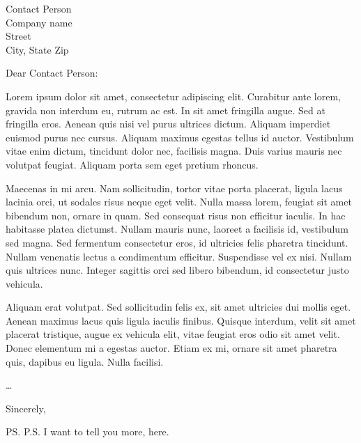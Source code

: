 \documentclass[10pt]{letter}
\begin{document}
\begin{letter}{Contact Person\\ Company name\\ Street\\ City, State Zip}

\opening{Dear Contact Person:}

Lorem ipsum dolor sit amet, consectetur adipiscing elit. Curabitur ante lorem, gravida non interdum eu, rutrum ac est. In sit amet fringilla augue. Sed at fringilla eros. Aenean quis nisi vel purus ultrices dictum. Aliquam imperdiet euismod purus nec cursus. Aliquam maximus egestas tellus id auctor. Vestibulum vitae enim dictum, tincidunt dolor nec, facilisis magna. Duis varius mauris nec volutpat feugiat. Aliquam porta sem eget pretium rhoncus.

Maecenas in mi arcu. Nam sollicitudin, tortor vitae porta placerat, ligula lacus lacinia orci, ut sodales risus neque eget velit. Nulla massa lorem, feugiat sit amet bibendum non, ornare in quam. Sed consequat risus non efficitur iaculis. In hac habitasse platea dictumst. Nullam mauris nunc, laoreet a facilisis id, vestibulum sed magna. Sed fermentum consectetur eros, id ultricies felis pharetra tincidunt. Nullam venenatis lectus a condimentum efficitur. Suspendisse vel ex nisi. Nullam quis ultrices nunc. Integer sagittis orci sed libero bibendum, id consectetur justo vehicula.

Aliquam erat volutpat. Sed sollicitudin felis ex, sit amet ultricies dui mollis eget. Aenean maximus lacus quis ligula iaculis finibus. Quisque interdum, velit sit amet placerat tristique, augue ex vehicula elit, vitae feugiat eros odio sit amet velit. Donec elementum mi a egestas auctor. Etiam ex mi, ornare sit amet pharetra quis, dapibus eu ligula. Nulla facilisi.

\dots

\closing{Sincerely,}

\ps{P.S. I want to tell you more, here.}

\end{letter}
\end{document}
